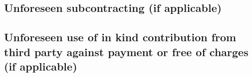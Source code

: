 \documentclass{deliverablereport}
\begin{document}
\subsection{Unforeseen subcontracting (if applicable)}


\subsection{Unforeseen use of in kind contribution from third party against payment or free 
of charges (if applicable)}

\end{document}
